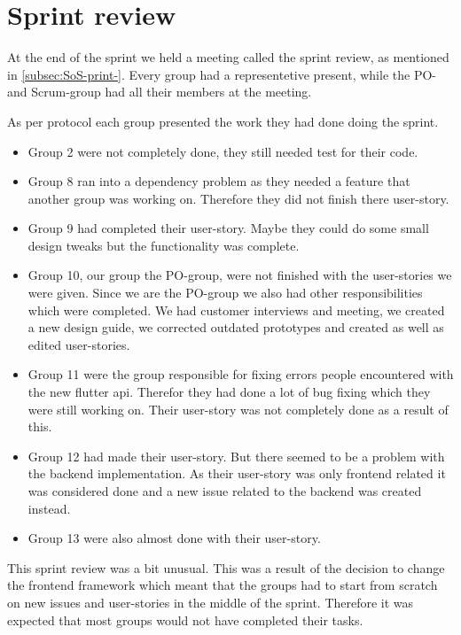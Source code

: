 \section{Sprint review}

At the end of the sprint we held a meeting called the sprint review, as mentioned in \ref{subsec:SoS-print-}.
Every group had a representetive present, while the PO- and Scrum-group had all their members at the meeting.

As per protocol each group presented the work they had done doing the sprint.
\begin{itemize}
    \item Group 2 were not completely done, they still needed test for their code.
    \item Group 8 ran into a dependency problem as they needed a feature that another group was working on. Therefore they did not finish there user-story.
    \item Group 9 had completed their user-story. Maybe they could do some small design tweaks but the functionality was complete.
    \item Group 10, our group the PO-group, were not finished with the user-stories we were given. Since we are the PO-group we also had other responsibilities which were completed. We had customer interviews and meeting, we created a new design guide, we corrected outdated prototypes and created as well as edited user-stories.
    \item Group 11 were the group responsible for fixing errors people encountered with the new flutter api. Therefor they had done a lot of bug fixing which they were still working on. Their user-story was not completely done as a result of this.
    \item Group 12 had made their user-story. But there seemed to be a problem with the backend implementation. As their user-story was only frontend related it was considered done and a new issue related to the backend was created instead.
    \item Group 13 were also almost done with their user-story.
\end{itemize}

This sprint review was a bit unusual. This was a result of the decision to change the frontend framework which meant that the groups had to start from scratch on new issues and user-stories in the middle of the sprint.
Therefore it was expected that most groups would not have completed their tasks.

